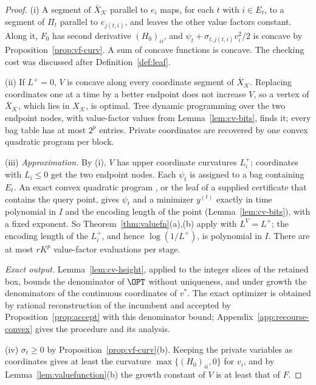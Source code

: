 \begin{proof}
(i) A segment of $\bar X_{\mathcal K}$ parallel to $e_i$ maps, for each $t$
with $i\in E_t$, to a segment of $\Pi_t$ parallel to $e_{j(t,i)}$, and
leaves the other value factors constant. Along it, $F_0$ has second
derivative $(H_0)_{ii}$, and $\psi_t+\sigma_{t,j(t,i)}v_i^2/2$ is concave by
Proposition~\ref{prop:vf-curv}. A sum of concave functions is concave. The
checking cost was discussed after Definition~\ref{def:leaf}.

(ii) If $L^+=0$, $V$ is concave along every coordinate segment of
$\bar X_{\mathcal K}$. Replacing coordinates one at a time by a better
endpoint does not increase $V$, so a vertex of $\bar X_{\mathcal K}$, which
lies in $X_{\mathcal K}$, is optimal. Tree dynamic programming over the two
endpoint nodes, with value-factor values from
Lemma~\ref{lem:cv-bits}, finds it; every bag table has at most $2^p$
entries. Private coordinates are recovered by one convex quadratic program
per block.

(iii) \emph{Approximation.} By (i), $V$ has upper coordinate curvatures
$L_i^+$; coordinates with $L_i\le0$ get the two endpoint nodes. Each
$\psi_t$ is assigned to a bag containing $E_t$. An exact convex quadratic
program \cite{KozlovTarasovKhachiyan1980}, or the leaf of a supplied
certificate that contains the query point, gives $\psi_t$ and a minimizer
$y^{(t)}$ exactly in time polynomial in $I$ and the encoding length of the
point (Lemma~\ref{lem:cv-bits}), with a fixed exponent. So
Theorem~\ref{thm:valuefn}(a),(b) apply with $L^V=L^+$; the encoding length
of the $L_i^+$, and hence $\log(1/L^+)$, is polynomial in $I$. There are at
most $rK^p$ value-factor evaluations per stage.

\emph{Exact output.} Lemma~\ref{lem:cv-height}, applied to the integer
slices of the retained box, bounds the denominator of $\OPT$ without
uniqueness, and under growth the denominators of the continuous coordinates
of $v^*$. The exact optimizer is obtained by rational reconstruction of the
incumbent and accepted by Proposition~\ref{prop:accept} with this
denominator bound; Appendix~\ref{app:recourse-convex} gives the procedure
and its analysis.

(iv) $\sigma_t\ge0$ by Proposition~\ref{prop:vf-curv}(b). Keeping the private
variables as coordinates gives at least the curvature $\max\{(H_0)_{ii},0\}$
for $v_i$, and by Lemma~\ref{lem:valuefunction}(b) the growth constant of
$V$ is at least that of $F$.
\end{proof}

